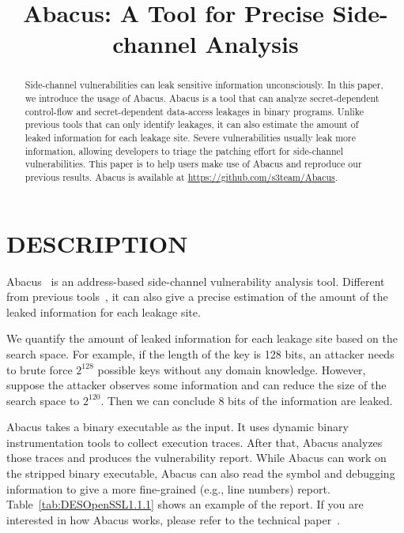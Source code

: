 \documentclass[10pt,conference]{IEEEtran}
\newcommand{\tool}{\textsf{Abacus}}
\begin{document}
\title{\tool{}: A Tool for Precise Side-channel Analysis}
\author{
}


\maketitle

\begin{abstract}
Side-channel vulnerabilities can leak sensitive information unconsciously. 
In this paper, we introduce the usage of Abacus. Abacus is a tool that can analyze secret-dependent control-flow and secret-dependent data-access leakages in binary programs. Unlike previous tools that can only identify leakages, it can also estimate the amount of leaked information for each leakage site. Severe vulnerabilities usually leak more information, allowing developers to triage the patching effort for side-channel vulnerabilities. This paper is to help users make use of Abacus and reproduce our previous
results. Abacus is available at \url{https://github.com/s3team/Abacus}.
\end{abstract}

\IEEEpeerreviewmaketitle
{}
\pagestyle{plain}
\section{DESCRIPTION}


\tool{}~\cite{bao2021abacus} is an address-based side-channel vulnerability analysis tool. Different from previous tools~\cite{203878,236338,182946}, it can also give a precise estimation of the amount of the leaked information for each leakage site.

We quantify the amount of leaked information for each leakage site based on the search space. For example, if the length of the key is 128 bits, an attacker needs to brute force $2^{128}$ possible keys without any domain knowledge. However, suppose the attacker observes some information and can reduce the size of the search space to $2^{120}$. Then we can conclude 8 bits of the information are leaked.

\tool{} takes a binary executable as the input. It uses dynamic binary instrumentation tools to collect execution traces. After that, \tool{} analyzes those traces and produces the vulnerability report. While \tool{} can work on the stripped binary executable, \tool{} can also read the symbol and debugging information to give a more fine-grained (e.g., line numbers) report. Table~\ref{tab:DESOpenSSL1.1.1} shows an example of the report. If you are interested in how \tool{} works, please refer to the technical paper~\cite{bao2021abacus}.
\end{document}
